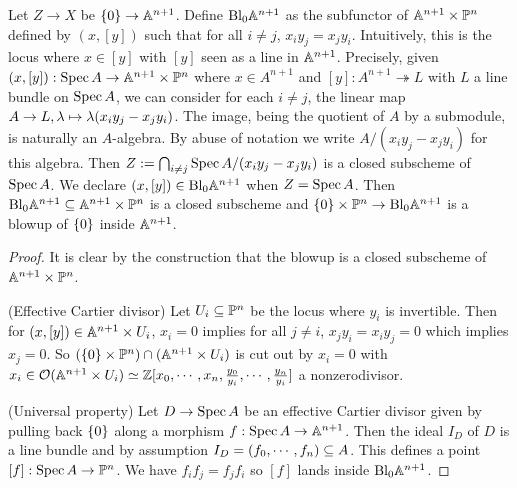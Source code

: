 \documentclass[./main.tex]{subfiles}
\begin{document}
\begin{prop}
  
  Let $Z \to X$ be $\left\{0\right\} \to \mathbb{A}^{n+1}$.
  Define $\mathrm{Bl}_0 \mathbb{A}^{n+1}$ as
  the subfunctor of $\mathbb{A}^{n+1} \times \mathbb{P}^n$ defined by
  $(x , [y])$ such that for all $i \neq j$, $x_i y_j = x_j y_i$.
  Intuitively, this is the locus where $x \in [y]$ with
  $[y]$ seen as a line in $\mathbb{A}^{n+1}$.
  Precisely,
  given $(x , [y]) : \operatorname{Spec} A \to \mathbb{A}^{n+1} \times \mathbb{P}^n$
  where $x \in A^{n+1}$ and $[y] : A^{n+1} \twoheadrightarrow L$
  with $L$ a line bundle on $\operatorname{Spec} A$,
  we can consider for each $i \neq j$,
  the linear map $A \to L , \lambda \mapsto \lambda(x_i y_j - x_j y_i)$.
  The image, being the quotient of $A$ by a submodule,
  is naturally an $A$-algebra.
  By abuse of notation we write $A / (x_i y_j - x_j y_i)$ for this algebra.
  Then $Z := \bigcap_{i \neq j} \operatorname{Spec} A / (x_i y_j - x_j y_i)$
  is a closed subscheme of $\operatorname{Spec} A$.
  We declare $(x , [y]) \in \mathrm{Bl}_0 \mathbb{A}^{n+1}$ when $Z = \operatorname{Spec} A$.
  Then $\mathrm{Bl}_0 \mathbb{A}^{n+1} \subseteq \mathbb{A}^{n+1} \times \mathbb{P}^n$ is a closed subscheme
  and $\left\{0\right\} \times \mathbb{P}^n \to \mathrm{Bl}_0 \mathbb{A}^{n+1}$
  is a blowup of $\left\{0\right\}$ inside $\mathbb{A}^{n+1}$.
\end{prop}
\begin{proof}
  It is clear by the construction that the blowup is a closed subscheme
  of $\mathbb{A}^{n+1} \times \mathbb{P}^n$.

  (Effective Cartier divisor)
  Let $U_i \subseteq \mathbb{P}^n$ be the locus where $y_i$ is invertible.
  Then for $(x , [y]) \in \mathbb{A}^{n+1} \times U_i$,
  $x_i = 0$ implies for all $j \neq i$, $x_j y_i = x_i y_j = 0$
  which implies $x_j = 0$.
  So $(\left\{0\right\} \times \mathbb{P}^n) \cap (\mathbb{A}^{n+1} \times U_i)$
  is cut out by $x_i = 0$ with $x_i \in \mathcal{O}(\mathbb{A}^{n+1} \times U_i)
  \simeq \mathbb{Z}[x_0 , \cdots , x_n , \frac{y_0}{y_i} , \cdots , \frac{y_n}{y_i}]$
  a nonzerodivisor.

  (Universal property)
  Let $D \to \operatorname{Spec} A$ be an effective Cartier divisor
  given by pulling back $\left\{0\right\}$ along a morphism $f : \operatorname{Spec} A \to \mathbb{A}^{n+1}$.
  Then the ideal $I_D$ of $D$ is a line bundle
  and by assumption $I_D = (f_0 , \cdots , f_n) \subseteq A$.
  This defines a point $[f] : \operatorname{Spec} A \to \mathbb{P}^n$.
  We have $f_i f_j = f_j f_i$ so $[f]$ lands inside $\mathrm{Bl}_0 \mathbb{A}^{n+1}$.

\end{proof}
\end{document}
